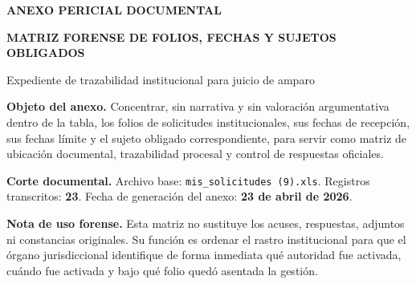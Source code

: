 \documentclass[11pt,letterpaper]{article}
\begin{document}
\begin{titlepage}

\vspace*{0.15cm}
{\sffamily\color{white}\bfseries\Large ANEXO PERICIAL DOCUMENTAL}\par
\vspace{0.25cm}
{\sffamily\color{white}\bfseries\fontsize{14.5}{17}\selectfont MATRIZ FORENSE DE FOLIOS, FECHAS Y SUJETOS OBLIGADOS}\par
\vspace{0.2cm}
{\sffamily\color{white}\normalsize Expediente de trazabilidad institucional para juicio de amparo}\par

\vspace{2.2cm}

\begin{tcolorbox}[
  enhanced,
  colback=GrisFondo,
  colframe=AzulFederal,
  boxrule=0.8pt,
  arc=2mm,
  left=8pt,right=8pt,top=8pt,bottom=8pt
]
\textbf{Objeto del anexo.} Concentrar, sin narrativa y sin valoración argumentativa dentro de la tabla, los folios de solicitudes institucionales, sus fechas de recepción, sus fechas límite y el sujeto obligado correspondiente, para servir como matriz de ubicación documental, trazabilidad procesal y control de respuestas oficiales.

\vspace{2mm}
\textbf{Corte documental.} Archivo base: \texttt{mis\_solicitudes (9).xls}. Registros transcritos: \textbf{23}. Fecha de generación del anexo: \textbf{23 de abril de 2026}.
\end{tcolorbox}

\vfill

\begin{tcolorbox}[
  enhanced,
  colback=white,
  colframe=RojoPericial,
  boxrule=0.7pt,
  arc=2mm,
  left=8pt,right=8pt,top=7pt,bottom=7pt
]
\textbf{Nota de uso forense.} Esta matriz no sustituye los acuses, respuestas, adjuntos ni constancias originales. Su función es ordenar el rastro institucional para que el órgano jurisdiccional identifique de forma inmediata qué autoridad fue activada, cuándo fue activada y bajo qué folio quedó asentada la gestión.
\end{tcolorbox}

\end{titlepage}
\end{document}
